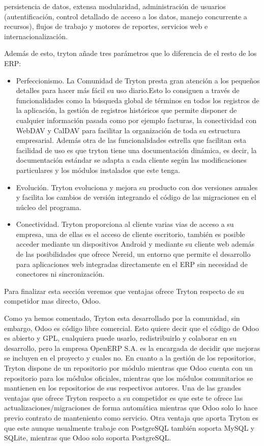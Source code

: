 \documentclass{article}
\begin{document}
persistencia de datos, extensa modularidad, administración de usuarios (autentificación, control detallado de acceso a los datos, manejo concurrente a recursos), flujos de trabajo y motores de reportes, servicios web e internacionalización.

Además de esto, tryton añade tres parámetros que lo diferencia de el resto de  los ERP:

\begin{itemize}
    \item Perfeccionismo. La Comunidad de Tryton presta gran atención a los pequeños detalles para hacer más fácil su uso 	diario.Esto lo consiguen a través de funcionalidades como la búsqueda global de términos en todos los registros de la aplicación, la gestión de registros históricos que permite disponer de cualquier información pasada como por ejemplo facturas, la conectividad con WebDAV y CalDAV para facilitar la organización de toda su estructura empresarial. Además otra de las funcionalidades estrella que facilitan esta facilidad de uso es que tryton tiene una documentación dinámica, es decir, la documentación estándar se adapta a cada cliente según las modificaciones particulares y los módulos instalados que este tenga.
    \item Evolución.  Tryton evoluciona y mejora  su producto con dos versiones anuales y facilita los cambios de versión integrando el código de las migraciones en el núcleo del programa.
    \item Conectividad. Tryton proporciona al cliente varias vias de acceso a su empresa, una de ellas es el acceso de cliente escritorio, también es posible acceder mediante un dispositivos Android y mediante su cliente web además de las  posibilidades que ofrece Nereid, un entorno que permite el desarrollo para aplicaciones web integradas directamente en el ERP sin necesidad de conectores ni sincronización.
\end{itemize}

Para finalizar esta sección veremos que ventajas ofrece Tryton respecto de su competidor mas directo, Odoo.

Como ya hemos comentado, Tryton esta desarrollado por la comunidad, sin embargo, Odoo es código libre comercial. Esto quiere decir que el código de Odoo es abierto y GPL, cualquiera puede usarlo, redistribuirlo y colaborar en su desarrollo, pero la empresa OpenERP S.A. es la encargada de decidir que mejoras se incluyen en el proyecto y cuales no.
En cuanto a la gestión de los repositorios, Tryton dispone de un repositorio por módulo mientras que Odoo cuenta con un repositorio para los módulos oficiales, mientras que los módulos comunitarios se mantienen en los repositorios de sus respectivos autores.
Una de las grandes ventajas que ofrece Tryton respecto a su competidor es que este te ofrece las actualizaciones/migraciones de forma automática mientras que Odoo solo lo hace previo contrato de manteniento como servicio.
Otra ventaja que aporta Tryton es que este aunque usualmente trabaje con PostgreSQL también soporta MySQL y SQLite, mientras que Odoo solo soporta PostgreSQL.
\end{document}
